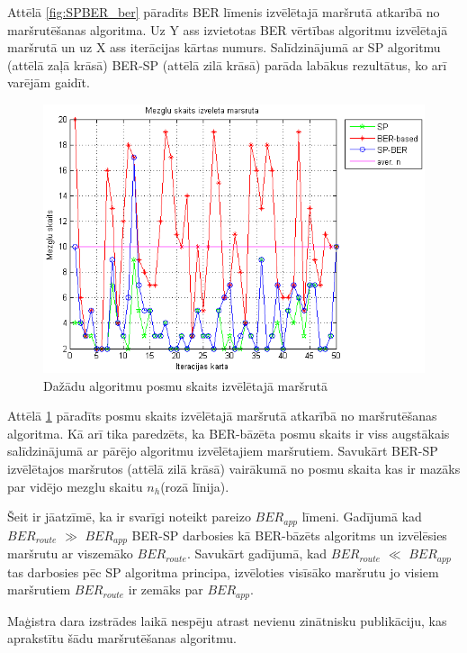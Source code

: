 Attēlā \ref{fig:SPBER_ber} pāradīts BER līmenis izvēlētajā maršrutā atkarībā no maršrutēšanas algoritma. Uz Y ass izvietotas BER vērtības algoritmu izvēlētajā maršrutā un uz X ass iterācijas kārtas numurs. Salīdzinājumā ar SP algoritmu (attēlā zaļā krāsā) BER-SP (attēlā zilā krāsā) parāda labākus rezultātus, ko arī varējām gaidīt.
\begin{figure}[!htb]
 \centering
 \includegraphics[scale=0.75]{./graph/BERSP_n}
\caption{Dažādu algoritmu posmu skaits izvēlētajā maršrutā}
\label{fig:SPBER_rho}
\end{figure}

Attēlā \ref{fig:SPBER_rho} pāradīts posmu skaits izvēlētajā maršrutā atkarībā no maršrutēšanas algoritma. Kā arī tika paredzēts, ka BER-bāzēta posmu skaits ir viss augstākais salīdzinājumā ar pārējo algoritmu izvēlētajiem maršrutiem. Savukārt BER-SP izvēlētajos maršrutos (attēlā zilā krāsā) vairākumā no posmu skaita kas ir mazāks par vidējo mezglu skaitu $n_{h}$(rozā līnija).

Šeit ir jāatzīmē, ka ir svarīgi noteikt pareizo $BER_{app}$ līmeni. Gadījumā kad $BER_{route}$ $\gg$ $BER_{app}$ BER-SP darbosies kā BER-bāzēts algoritms un izvēlēsies maršrutu ar viszemāko $BER_{route}$. Savukārt gadījumā, kad $BER_{route}$ $\ll$ $BER_{app}$ tas darbosies pēc SP algoritma principa, izvēloties visīsāko maršrutu jo visiem maršrutiem $BER_{route}$ ir zemāks par $BER_{app}$.

Maģistra dara izstrādes laikā nespēju atrast nevienu zinātnisku publikāciju, kas aprakstītu šādu maršrutēšanas algoritmu.